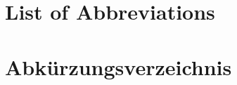 \ifdefined\ThesisLanguageIsEnglish
	\chapter*{List of Abbreviations}
\else
	\chapter*{Abkürzungsverzeichnis}
\fi
\begin{acronym}[LONG]
\end{acronym}
